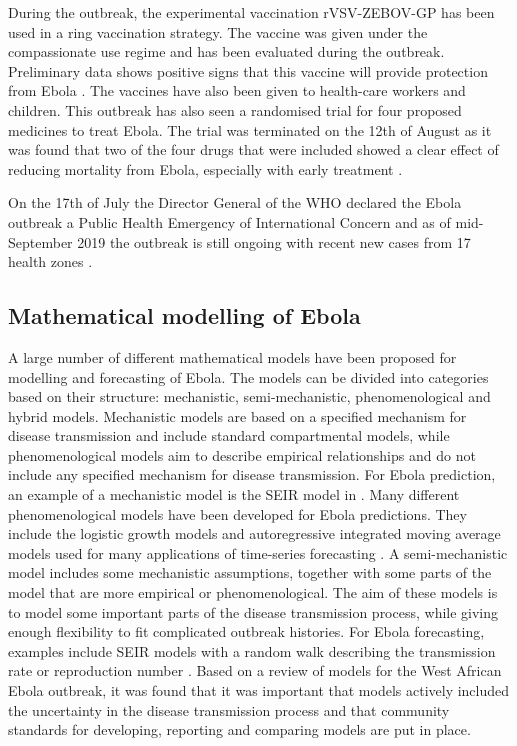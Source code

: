 \documentclass[12pt]{article}
\begin{document}
During the outbreak, the experimental vaccination rVSV-ZEBOV-GP has been used in a ring vaccination strategy. The vaccine was given under the compassionate use regime and has been evaluated during the outbreak. Preliminary data shows positive signs that this vaccine will provide protection from Ebola \cite{organizationPreliminaryResultsEfficacy2019}. The vaccines have also been given to health-care workers and children. This outbreak has also seen a randomised trial for four proposed medicines to treat Ebola. The trial was terminated on the 12th of August as it was found that two of the four drugs that were included showed a clear effect of reducing mortality from Ebola, especially with early treatment \cite{nationalinstituteofallergyandinfectiousdiseasesIndependentMonitoringBoard2019}.

On the 17th of July the Director General of the WHO declared the Ebola outbreak a Public Health Emergency of International Concern \cite{worldhealthorganizationEbolaOutbreakDRC2019} and as of mid-September 2019 the outbreak is still ongoing with recent new cases from 17 health zones \cite{worldhealthorganizationEbolaOutbreakDRC2019b}. 

\subsection{Mathematical modelling of Ebola}

A large number of different mathematical models have been proposed for modelling and forecasting of Ebola\cite{chretienMathematicalModelingWest,viboudRAPIDDEbolaForecasting2018}. The models can be divided into categories based on their structure: mechanistic, semi-mechanistic, phenomenological and hybrid models. Mechanistic models are based on a specified mechanism for disease transmission and include standard compartmental models, while phenomenological models aim to describe empirical relationships and do not include any specified mechanism for disease transmission. For Ebola prediction, an example of a mechanistic model is the SEIR model in \cite{gaffeyApplicationCDCEbolaResponse2018}. Many different phenomenological models have been developed for Ebola predictions. They include the logistic growth models \cite{pellUsingPhenomenologicalModels2018} and autoregressive integrated moving average models used for many applications of time-series forecasting \cite{mForecastingTrendCases2017}. A semi-mechanistic model includes some mechanistic assumptions, together with some parts of the model that are more empirical or phenomenological. The aim of these models is to model some important parts of the disease transmission process, while giving enough flexibility to fit complicated outbreak histories. For Ebola forecasting, examples include SEIR models with a random walk describing the transmission rate or reproduction number  \cite{funkAssessingPerformanceRealtime2019,asherForecastingEbolaRegression2018}. Based on a review of models for the West African Ebola outbreak, it was found that it was important that models actively included the uncertainty in the disease transmission process \cite{chretienMathematicalModelingWest, kingAvoidableErrorsModelling2015} and that community standards for developing, reporting and comparing models are put in place. 
\end{document}

